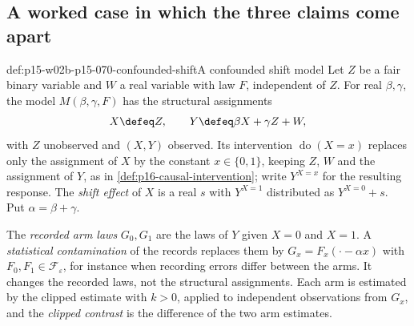 \subsection{A worked case in which the three claims come apart}
\label{sec:p15-w02b-p15-070-worked-case}

\begin{hbdefinition}{def:p15-w02b-p15-070-confounded-shift}{A confounded shift model}
Let \(Z\) be a fair binary variable and \(W\) a real variable with law
\(F\), independent of \(Z\). For real \(\beta,\gamma\), the model
\(M(\beta,\gamma,F)\) has the structural assignments
\[
 X\defeq Z,\qquad Y\defeq\beta X+\gamma Z+W,
\]
with \(Z\) unobserved and \((X,Y)\) observed. Its intervention
\(\operatorname{do}(X=x)\) replaces only the assignment of \(X\) by the
constant \(x\in\{0,1\}\), keeping \(Z\), \(W\) and the assignment of
\(Y\), as in \cref{def:p16-causal-intervention}; write \(Y^{X=x}\) for
the resulting response. The \emph{shift effect} of \(X\) is a real
\(s\) with \(Y^{X=1}\) distributed as \(Y^{X=0}+s\). Put
\(\alpha=\beta+\gamma\).

The \emph{recorded arm laws} \(G_0,G_1\) are the laws of \(Y\) given
\(X=0\) and \(X=1\). A \emph{statistical contamination} of the records
replaces them by \(G_x=F_x(\cdot-\alpha x)\) with
\(F_0,F_1\in\mathcal F_\varepsilon\), for instance when recording errors
differ between the arms. It changes the recorded laws, not the structural
assignments. Each arm is estimated by the clipped estimate with \(k>0\),
applied to independent observations from \(G_x\), and the
\emph{clipped contrast} is the difference of the two arm estimates.
\end{hbdefinition}

